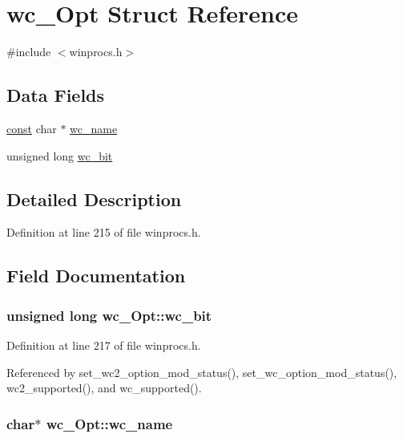 \hypertarget{structwc__Opt}{\section{wc\+\_\+\+Opt Struct Reference}
\label{structwc__Opt}
}


{\ttfamily \#include $<$winprocs.\+h$>$}

\subsection*{Data Fields}
\begin{DoxyCompactItemize}
\item 
\hyperlink{tradstdc_8h_a2c212835823e3c54a8ab6d95c652660e}{const} char $\ast$ \hyperlink{structwc__Opt_abd10cc00e2437ca67ede0eda296dff3a}{wc\+\_\+name}
\item 
unsigned long \hyperlink{structwc__Opt_acf188b7fafd5fa1f1e56c3315f9ae666}{wc\+\_\+bit}
\end{DoxyCompactItemize}


\subsection{Detailed Description}


Definition at line 215 of file winprocs.\+h.



\subsection{Field Documentation}
\hypertarget{structwc__Opt_acf188b7fafd5fa1f1e56c3315f9ae666}{
\subsubsection[{wc\+\_\+bit}]{\setlength{\rightskip}{0pt plus 5cm}unsigned long wc\+\_\+\+Opt\+::wc\+\_\+bit}}\label{structwc__Opt_acf188b7fafd5fa1f1e56c3315f9ae666}


Definition at line 217 of file winprocs.\+h.



Referenced by set\+\_\+wc2\+\_\+option\+\_\+mod\+\_\+status(), set\+\_\+wc\+\_\+option\+\_\+mod\+\_\+status(), wc2\+\_\+supported(), and wc\+\_\+supported().

\hypertarget{structwc__Opt_abd10cc00e2437ca67ede0eda296dff3a}{
\subsubsection[{wc\+\_\+name}]{ char$\ast$ wc\+\_\+\+Opt\+::wc\+\_\+name}}\label{structwc__Opt_abd10cc00e2437ca67ede0eda296dff3a}


